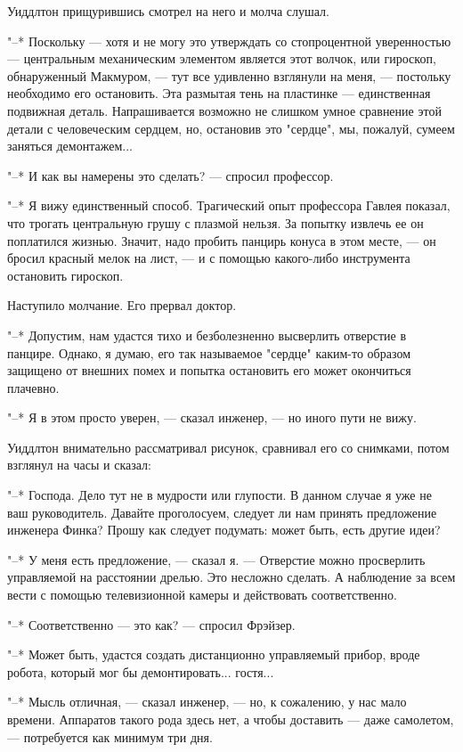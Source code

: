 Уиддлтон прищурившись смотрел на него и молча слушал.

"--*  Поскольку  ---  хотя  и  не  могу  это  утверждать  со   стопроцентной
уверенностью --- центральным механическим элементом  является  этот  волчок,
или гироскоп, обнаруженный Макмуром, ---  тут  все  удивленно  взглянули  на
меня,  ---  постольку  необходимо  его  остановить.  Эта  размытая  тень  на
пластинке ---  единственная  подвижная  деталь.  Напрашивается  возможно  не
слишком умное сравнение этой детали с человеческим сердцем, но,  остановив
это "сердце", мы, пожалуй, сумеем заняться демонтажем...

"--* И как вы намерены это сделать? --- спросил профессор.

"--* Я  вижу  единственный  способ.  Трагический  опыт  профессора  Гавлея
показал, что трогать  центральную  грушу  с  плазмой  нельзя.  За  попытку
извлечь ее он поплатился жизнью. Значит, надо  пробить  панцирь  конуса  в
этом месте, --- он бросил красный мелок на лист, --- и с  помощью  какого-либо
инструмента остановить гироскоп.

Наступило молчание. Его прервал доктор.

"--* Допустим, нам удастся тихо и  безболезненно  высверлить  отверстие  в
панцире. Однако, я думаю, его так  называемое  "сердце"  каким-то  образом
защищено от внешних  помех  и  попытка  остановить  его  может  окончиться
плачевно.

"--* Я в этом просто уверен, --- сказал инженер, --- но иного пути не вижу.

Уиддлтон внимательно рассматривал рисунок, сравнивал его  со  снимками,
потом взглянул на часы и сказал:

"--* Господа. Дело тут не в мудрости или глупости. В данном случае  я  уже
не  ваш  руководитель.  Давайте  проголосуем,  следует  ли   нам   принять
предложение инженера Финка? Прошу как следует подумать: может  быть,  есть
другие идеи?

"--* У меня есть предложение, --- сказал я. ---  Отверстие  можно  просверлить
управляемой на расстоянии дрелью. Это несложно сделать.  А  наблюдение  за
всем вести с помощью телевизионной камеры и действовать соответственно.

"--* Соответственно --- это как? --- спросил Фрэйзер.

"--* Может быть, удастся создать дистанционно  управляемый  прибор,  вроде
робота, который мог бы демонтировать... гостя...

"--* Мысль отличная, --- сказал инженер, ---  но,  к  сожалению,  у  нас  мало
времени. Аппаратов такого  рода  здесь  нет,  а  чтобы  доставить  ---  даже
самолетом, --- потребуется как минимум три дня.

